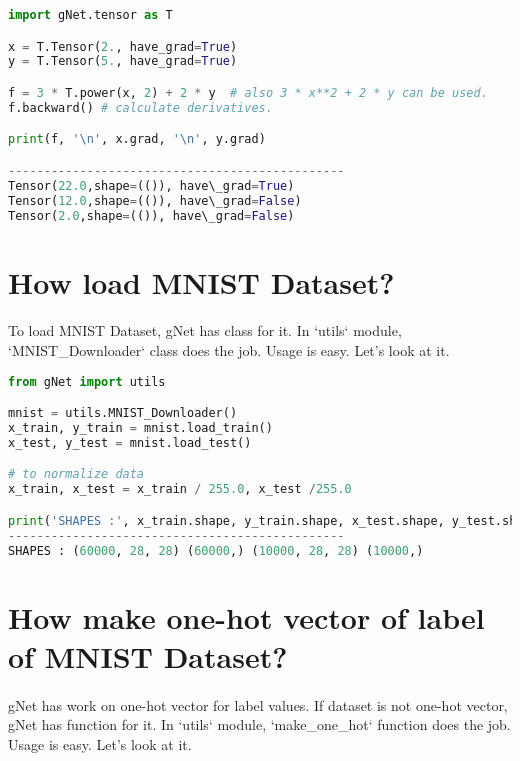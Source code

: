\documentclass[12pt]{report}
\begin{document}
\begin{lstlisting}[language=Python, numbers=none, caption={Calculation of gradient.}, label={ex:grad-calc}]
import gNet.tensor as T

x = T.Tensor(2., have_grad=True)
y = T.Tensor(5., have_grad=True)

f = 3 * T.power(x, 2) + 2 * y  # also 3 * x**2 + 2 * y can be used.
f.backward() # calculate derivatives. 

print(f, '\n', x.grad, '\n', y.grad)

-----------------------------------------------
Tensor(22.0,shape=(()), have\_grad=True) 
Tensor(12.0,shape=(()), have\_grad=False)
Tensor(2.0,shape=(()), have\_grad=False)
\end{lstlisting}



\section{How load MNIST Dataset?}
\paragraph{}
To load MNIST Dataset, gNet has class for it. In `utils` module, `MNIST\_Downloader` class does the job. Usage is easy. Let's look at it.

\begin{lstlisting}[language=Python, numbers=none, caption={Load MNIST Dataset.}, label={ex:mnist-load}]
from gNet import utils

mnist = utils.MNIST_Downloader()
x_train, y_train = mnist.load_train()
x_test, y_test = mnist.load_test()

# to normalize data
x_train, x_test = x_train / 255.0, x_test /255.0

print('SHAPES :', x_train.shape, y_train.shape, x_test.shape, y_test.shape)
-----------------------------------------------
SHAPES : (60000, 28, 28) (60000,) (10000, 28, 28) (10000,)
\end{lstlisting}



\section{How make one-hot vector of label of MNIST Dataset?}
\paragraph{}
gNet has work on one-hot vector for label values. If dataset is not one-hot vector, gNet has function for it. In `utils` module, `make\_one\_hot` function does the job. Usage is easy. Let's look at it.
\end{document}
